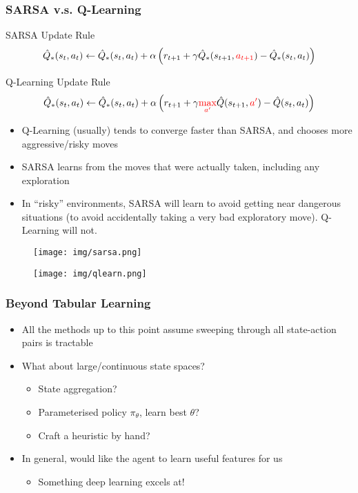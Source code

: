 \documentclass[10pt,a4paper]{beamer}
\newcommand{\red}[1]{\textcolor{red}{#1}}
\begin{document}
\begin{frame}
	\frametitle{SARSA v.s. Q-Learning}
	\begin{block}{SARSA Update Rule}
		$$
		\hat{Q}_*(s_t, a_t) \leftarrow  \hat{Q}_*(s_t, a_t) + \alpha 
		\left( r_{t+1} + \gamma \hat{Q}_*(s_{t+1}, \red{a_{t+1}}) - \hat{Q}_*(s_t, a_t) \right) 
		$$
	\end{block}
\begin{block}{Q-Learning Update Rule}
	$$
	\hat{Q}_*(s_t, a_t)  \leftarrow \hat{Q}_*(s_t,a_t)
	+ \alpha \left( 
	r_{t+1} + \gamma \red{\max_{a'}} \hat{Q}(s_{t+1}, \red{a'}) - \hat{Q}(s_t, a_t)
	\right)
	$$
\end{block}
\begin{itemize}
	\item Q-Learning (usually) tends to converge faster than SARSA, and chooses more
	aggressive/risky moves 
	\item SARSA learns from the moves that were actually
	taken, including any exploration
	\item In ``risky'' environments, SARSA will learn to avoid getting near dangerous situations
	(to avoid accidentally taking a very bad exploratory move). Q-Learning will not.
\end{itemize}
\end{frame}


\begin{frame}
	
	\begin{figure}
		\centering
		\texttt{[image: img/sarsa.png]}
	\end{figure}
	\vspace{-0.45cm}
	\begin{figure}
		\centering
		\texttt{[image: img/qlearn.png]}
	\end{figure}
\end{frame}


\begin{frame}
	\frametitle{Beyond Tabular Learning}
	
\begin{itemize}
	\item All the methods up to this point assume sweeping through 
	all state-action pairs is tractable
	\pause
	\item What about large/continuous state spaces?
	\pause
	\begin{itemize}
		\item State aggregation?
		\pause
		\item Parameterised policy $\pi_\theta$, learn best $\theta$?
		\pause
		\item Craft a heuristic by hand?
	\end{itemize}
\pause
	\item In general, would like the agent to learn useful features for us
	\pause
	\begin{itemize}
		\item Something deep learning excels at!
	\end{itemize}
\end{itemize}
\end{frame}
\end{document}
